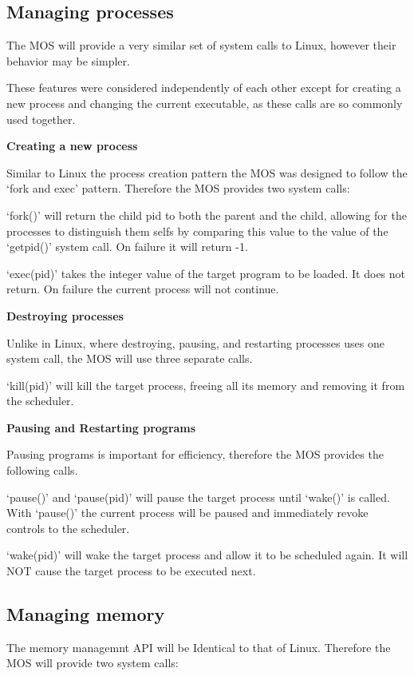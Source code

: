 \documentclass[a4paper]{report}
\begin{document}
\subsection{Managing processes}

The MOS will provide a very similar set of system calls to Linux, however their behavior may be simpler.

These features were considered independently of each other except for creating a new process and changing the current executable, as these calls are so commonly used together.

\textbf{Creating a new process}

Similar to Linux the process creation pattern the MOS was designed to follow the `fork and exec' pattern. Therefore the MOS provides two system calls:

`fork()' will return the child pid to both the parent and the child, allowing for the processes to distinguish them selfs by comparing this value to the value of the `get\textunderscore pid()' system call. On failure it will return -1.

`exec(pid)' takes the integer value of the target program to be loaded. It does not return. On failure the current process will not continue.

\textbf{Destroying processes}

Unlike in Linux, where destroying, pausing, and restarting processes uses one system call, the MOS will use three separate calls.

`kill(pid)' will kill the target process, freeing all its memory and removing it from the scheduler.

\textbf{Pausing and Restarting programs}

Pausing programs is important for efficiency, therefore the MOS provides the following calls.

`pause()' and `pause(pid)' will pause the target process until `wake()' is called. With `pause()' the current process will be paused and immediately revoke controls to the scheduler.

`wake(pid)' will wake the target process and allow it to be scheduled again. It will NOT cause the target process to be executed next.

\subsection{Managing memory}

The memory managemnt API will be Identical to that of Linux. Therefore the MOS will provide two system calls:
\end{document}
